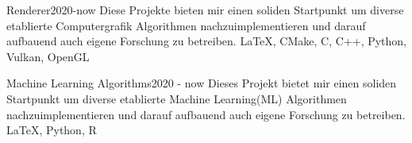{\begin{projects}
    \end{projects}
}{

    \begin{projects}
        \project
    	{Renderer}{2020-now}
    	{}
    	{Diese Projekte bieten mir einen soliden Startpunkt um diverse etablierte Computergrafik Algorithmen nachzuimplementieren und darauf aufbauend auch eigene Forschung zu betreiben.}
    	{\LaTeX, CMake, C, C++, Python, Vulkan, OpenGL}
        
    	\project
    	{Machine Learning Algorithms}{2020 - now}
    	{}
    	{Dieses Projekt bietet mir einen soliden Startpunkt um diverse etablierte Machine Learning(ML) Algorithmen nachzuimplementieren und darauf aufbauend auch eigene Forschung zu betreiben.}
    	{\LaTeX, Python, R}
     
    	

        
    \end{projects}
}
